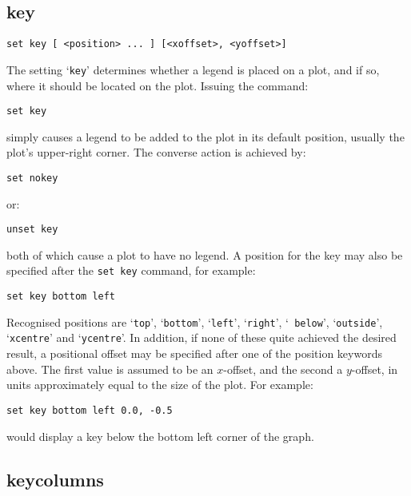 \subsection{key}

\begin{verbatim}
set key [ <position> ... ] [<xoffset>, <yoffset>]
\end{verbatim}

The setting `{\tt key}' determines whether a legend is placed on a plot, and if
so, where it should be located on the plot. Issuing the command:

\begin{verbatim}
set key
\end{verbatim}

\noindent simply causes a legend to be added to the plot in its default position, usually
the plot's upper-right corner. The converse action is achieved by:

\begin{verbatim}
set nokey
\end{verbatim}

\noindent or:

\begin{verbatim}
unset key
\end{verbatim}

\noindent both of which cause a plot to have no legend. A position for the key may also
be specified after the {\tt set key} command, for example:

\begin{verbatim}
set key bottom left
\end{verbatim}

Recognised positions are `{\tt top}', `{\tt bottom}', `{\tt left}', `{\tt right}', `{\tt
below}', `{\tt outside}', `{\tt xcentre}' and `{\tt ycentre}'. In addition, if none of
these quite achieved the desired result, a positional offset may be specified
after one of the position keywords above.  The first value is assumed to be an
$x$-offset, and the second a $y$-offset, in units approximately equal to the
size of the plot. For example:

\begin{verbatim}
set key bottom left 0.0, -0.5
\end{verbatim}

\noindent would display a key below the bottom left corner of the graph.


\subsection{keycolumns}

